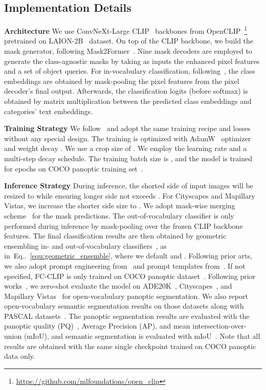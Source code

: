 \documentclass{article}
\makeatletter
\DeclareRobustCommand\onedot{\futurelet\@let@token\@onedot}
\def\@onedot{\ifx\@let@token.\else.\null\fi\xspace}
\newcommand{\equref}[1]{Eq\onedot~\eqref{#1}}
\newcommand{\modelname}{FC-CLIP\xspace}
\makeatother
\begin{document}
\subsection{Implementation Details}
\label{sec:implementation}
\noindent \textbf{Architecture}\quad
We use ConvNeXt-Large CLIP~\cite{liu2022convnet,radford2021learning} backbones from OpenCLIP~\cite{ilharco_gabriel_2021_5143773}\footnote{\url{https://github.com/mlfoundations/open_clip}} pretrained on LAION-2B~\cite{schuhmann2022laion} dataset.
On top of the CLIP backbone, we build the mask generator, following Mask2Former~\cite{cheng2021masked}.
Nine mask decoders are employed to generate the class-agnostic masks by taking as inputs the enhanced pixel features and a set of object queries.
For in-vocabulary classification, following~\cite{ghiasi2022scaling}, the class embeddings are obtained by mask-pooling the pixel features from the pixel decoder's final output.
Afterwards, the classification logits (before softmax) is obtained by matrix multiplication between the predicted class embeddings and categories' text embeddings.

\noindent \textbf{Training Strategy}\quad
We follow~\cite{cheng2021masked} and adopt the same training recipe and losses without any special design. 
The training is optimized with AdamW~\cite{kingma2014adam,loshchilov2017decoupled} optimizer and weight decay . We use a crop size of .
We employ the learning rate  and a multi-step decay schedule.
The training batch size is , and the model is trained for  epochs on COCO panoptic training set~\cite{lin2014microsoft}.

\noindent \textbf{Inference Strategy}\quad
During inference, the shorted side of input images will be resized to  while ensuring longer side not exceeds . For Cityscapes and Mapillary Vistas, we increase the shorter side size to . We adopt mask-wise merging scheme~\cite{cheng2021masked} for the mask predictions.
The out-of-vocabulary classifier is only performed during inference by mask-pooling over the frozen CLIP backbone features.
The final classification results are then obtained by geometric ensembling in- and out-of-vocabulary classifiers~\cite{gu2021open,ghiasi2022scaling,kuo2022f,xu2023open}, as in~\equref{equ:geometric_ensemble}, where we default  and .
Following prior arts, we also adopt prompt engineering from~\cite{ghiasi2022scaling,xu2023open} and prompt templates from~\cite{gu2021open,liang2022open}.
If not specified, \modelname is only trained on COCO panoptic dataset~\cite{lin2014microsoft}.
Following prior works~\cite{ghiasi2022scaling,xu2023open}, we zero-shot evaluate the model on ADE20K~\cite{zhou2017scene}, Cityscapes~\cite{Cordts2016Cityscapes}, and Mapillary Vistas~\cite{neuhold2017mapillary} for open-vocabulary panoptic segmentation.
We also report open-vocabulary semantic segmentation results on those datasets along with PASCAL datasets~\cite{everingham2010pascal,mottaghi2014role}.
The panoptic segmentation results are evaluated with the panoptic quality (PQ)~\cite{kirillov2018panoptic}, Average Precision (AP), and mean intersection-over-union (mIoU), and semantic segmentation is evaluated with mIoU~\cite{everingham2010pascal}.
Note that all results are obtained with the same single checkpoint trained on COCO panoptic data only.
\end{document}
